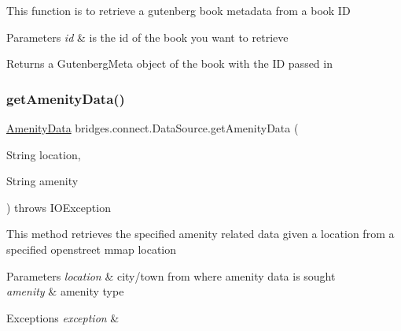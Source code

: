 This function is to retrieve a gutenberg book metadata from a book ID


\begin{DoxyParams}{Parameters}
{\em id} & is the id of the book you want to retrieve\\
\hline
\end{DoxyParams}
\begin{DoxyReturn}{Returns}
a Gutenberg\+Meta object of the book with the ID passed in 
\end{DoxyReturn}
\mbox{\label{classbridges_1_1connect_1_1_data_source_aa25f4d7521aa1ad788b60816eb2088db}} 
\subsubsection{\texorpdfstring{get\+Amenity\+Data()}{getAmenityData()}\hspace{0.1cm}{\footnotesize\ttfamily [1/2]}}
{\footnotesize\ttfamily \hyperlink{classbridges_1_1data__src__dependent_1_1_amenity_data}{Amenity\+Data} bridges.\+connect.\+Data\+Source.\+get\+Amenity\+Data (\begin{DoxyParamCaption}\item[{String}]{location,  }\item[{String}]{amenity }\end{DoxyParamCaption}) throws I\+O\+Exception}

This method retrieves the specified amenity related data given a location from a specified openstreet mmap location


\begin{DoxyParams}{Parameters}
{\em location} & city/town from where amenity data is sought \\
\hline
{\em amenity} & amenity type \\
\hline
\end{DoxyParams}

\begin{DoxyExceptions}{Exceptions}
{\em exception} & \\
\hline
\end{DoxyExceptions}
\mbox{\label{classbridges_1_1connect_1_1_data_source_a4fdb7ddbeecaa30a4e6972c0b537bb44}} 
